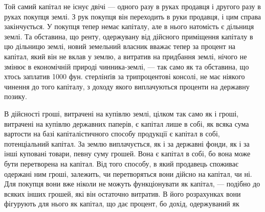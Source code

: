 Той самий капітал не існує двічі — одного разу в руках продавця і другого
разу в руках покупця землі. З рук покупця він переходить в руки продавця,
і цим справа закінчується. У покупця тепер немає капіталу, але в нього
натомість є дільниця землі. Та обставина, що ренту, одержувану від дійсного
приміщення капіталу в цю дільницю землі, новий земельний власник вважає
тепер за процент на капітал, який він не вклав у землю, а витратив на придбання
землі, нічого не змінює в економічній природі чинника-землі, — так само
як та обставина, що хтось заплатив 1000 фун. стерлінґів за трипроцентові консолі,
не має ніякого чинення до того капіталу, з доходу якого виплачуються проценти
на державну позику.

В дійсності гроші, витрачені на купівлю землі, цілком так само як і
гроші, витрачені на купівлю державних паперів, є капітал лише в собі, як
всяка сума вартости на базі капіталістичного способу продукції є капітал в собі,
потенціальний капітал. За землю виплачується, як і за державні фонди, як і
за інші куповані товари, певну суму грошей. Вона є капітал в собі, бо вона
може бути перетворена на капітал. Від того способу, в який продавець споживає
одержані ним гроші, залежить, чи перетворяться вони дійсно на капітал, чи ні.
Для покупця вони вже ніколи не можуть функціонувати як капітал, — подібно
до всяких інших грошей, які він остаточно витратив. В його розрахунках вони
фігурують для нього як капітал, що дає процент, бо дохід, одержуваний як
